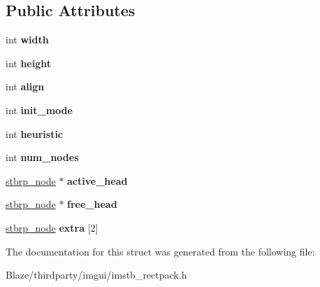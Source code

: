 \subsection*{Public Attributes}
\begin{DoxyCompactItemize}
\item 
\mbox{\label{structstbrp__context_a70cfcb2044ce8397cc440d28b30c09b2}} 
int {\bfseries width}
\item 
\mbox{\label{structstbrp__context_af3715a6f3faecfb4fac8f6ccbb71f9c7}} 
int {\bfseries height}
\item 
\mbox{\label{structstbrp__context_ae36053e2001a725aec2b5756dc990481}} 
int {\bfseries align}
\item 
\mbox{\label{structstbrp__context_a007509feee322404083034e4c2d3dc5d}} 
int {\bfseries init\+\_\+mode}
\item 
\mbox{\label{structstbrp__context_a4b61a7f94e50a54c075e2a8f99f6503a}} 
int {\bfseries heuristic}
\item 
\mbox{\label{structstbrp__context_afa8105d4ef6d3e0ae5aaf8e1ed4b2c58}} 
int {\bfseries num\+\_\+nodes}
\item 
\mbox{\label{structstbrp__context_a13277239636803aff28f00b0a0376120}} 
\hyperlink{structstbrp__node}{stbrp\+\_\+node} $\ast$ {\bfseries active\+\_\+head}
\item 
\mbox{\label{structstbrp__context_a1336ae32373663847866cc65904c2839}} 
\hyperlink{structstbrp__node}{stbrp\+\_\+node} $\ast$ {\bfseries free\+\_\+head}
\item 
\mbox{\label{structstbrp__context_a0b80e1fbdac125427526f3500d4e7624}} 
\hyperlink{structstbrp__node}{stbrp\+\_\+node} {\bfseries extra} \mbox{[}2\mbox{]}
\end{DoxyCompactItemize}


The documentation for this struct was generated from the following file\+:\begin{DoxyCompactItemize}
\item 
Blaze/thirdparty/imgui/imstb\+\_\+rectpack.\+h\end{DoxyCompactItemize}
